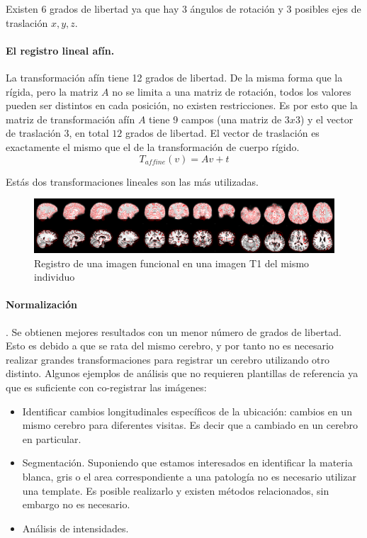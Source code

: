 Existen $6$ grados de libertad ya que hay 3 ángulos de rotación y 3 posibles ejes de traslación $x,y,z$. 

\paragraph{El registro lineal afín.} La transformación afín tiene 12 grados de libertad. De la misma forma que la rígida, pero la matriz $A$ no se limita a una matriz de rotación, todos los valores pueden ser distintos en cada posición, no existen restricciones.
Es por esto que la matriz de transformación afín $A$ tiene 9 campos (una matriz de $3x3$) y el vector de traslación $3$, en total $12$ grados de libertad.
El vector de traslación es exactamente el mismo que el de la transformación de cuerpo rígido.
$$T_{affine}(v) = Av + t$$

Estás dos transformaciones lineales son las más utilizadas. 

\begin{figure}[H]
  \centering
    \includegraphics[scale=0.75]{img/func2t1.png}
  \caption{Registro de una imagen funcional en una imagen T1 del mismo individuo}         \label{preproc:func2t1}
\end{figure}

\paragraph{Normalización}. Se obtienen mejores resultados con un menor número de grados de libertad. Esto es debido a que se rata del mismo cerebro, y por tanto no es necesario realizar grandes transformaciones para registrar un cerebro utilizando otro distinto.
Algunos ejemplos de análisis que no requieren plantillas de referencia ya que es suficiente con co-registrar las imágenes:
\begin{itemize}
 \item Identificar cambios longitudinales específicos de la ubicación: cambios en un mismo cerebro para diferentes visitas. Es decir que a cambiado en un cerebro en particular.
 \item Segmentación. Suponiendo que estamos interesados en identificar la materia blanca, gris o el area correspondiente a una patología no es necesario utilizar una template. Es posible realizarlo y existen métodos relacionados, sin embargo no es necesario.
 \item Análisis de intensidades.
\end{itemize}

